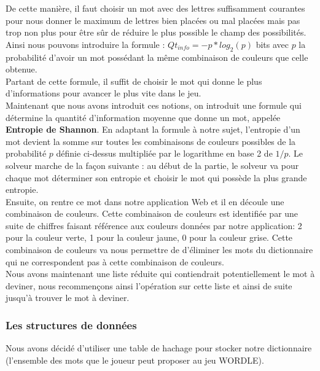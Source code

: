 De cette manière, il faut choisir un mot avec des lettres suffisamment courantes pour nous donner le maximum de lettres bien placées ou mal placées mais pas trop non plus pour être sûr de réduire le plus possible le champ des possibilités.\\

Ainsi nous pouvons introduire la formule : $Qt_{info} = -p * log_2(p)$ bits avec $p$ la probabilité d'avoir un mot possédant la même combinaison de couleurs que celle obtenue. \\

Partant de cette formule, il suffit de choisir le mot qui donne le plus d'informations pour avancer le plus vite dans le jeu.\\

Maintenant que nous avons introduit ces notions, on introduit une formule qui détermine la quantité d'information moyenne que donne un mot, appelée \textbf{Entropie de Shannon}. En adaptant la formule à notre sujet, l'entropie d'un mot devient la somme sur toutes les combinaisons de couleurs possibles de la probabilité $p$ définie ci-dessus multipliée par le logarithme en base 2 de $1/p$. 
Le solveur marche de la façon suivante : au début de la partie, le solveur va pour chaque mot déterminer son entropie et choisir le mot qui possède la plus grande entropie.\\

Ensuite, on rentre ce mot dans notre application Web et il en découle une combinaison de couleurs. Cette combinaison de couleurs est identifiée par une suite de chiffres faisant référence aux couleurs données par notre application: 2 pour la couleur verte, 1 pour la couleur jaune, 0 pour la couleur grise. Cette combinaison de couleurs va nous permettre de d'éliminer les mots du dictionnaire qui ne correspondent pas à cette combinaison de couleurs.\\


Nous avons maintenant une liste réduite qui contiendrait potentiellement le mot à deviner, nous recommençons ainsi l'opération sur cette liste et ainsi de suite jusqu'à trouver le mot à deviner. \\

\subsubsection{Les structures de données}

Nous avons décidé d'utiliser une table de hachage pour stocker notre dictionnaire (l'ensemble des mots que le joueur peut proposer au jeu WORDLE).\\

